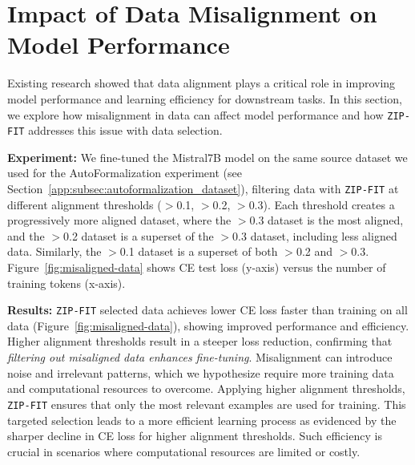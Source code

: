 \section{Impact of Data Misalignment on Model Performance}

Existing research showed that data alignment plays a critical role in improving model performance and learning efficiency for downstream tasks. In this section, we explore how misalignment in data can affect model performance and how \texttt{ZIP-FIT} addresses this issue with data selection.

\textbf{Experiment:} We fine-tuned the Mistral7B model on the same source dataset we used for the AutoFormalization experiment (see Section~\ref{app:subsec:autoformalization_dataset}), filtering data with \texttt{ZIP-FIT} at different alignment thresholds ($>$0.1, $>$0.2, $>$0.3). 
Each threshold creates a progressively more aligned dataset, where the $>$0.3 dataset is the most aligned, and the $>$0.2 dataset is a superset of the $>$0.3 dataset, including less aligned data. 
Similarly, the $>$0.1 dataset is a superset of both $>$0.2 and $>$0.3.
Figure~\ref{fig:misaligned-data} shows CE test loss (y-axis) versus the number of training tokens (x-axis). 

\textbf{Results:} \texttt{ZIP-FIT} selected data achieves lower CE loss faster than training on all data (Figure~\ref{fig:misaligned-data}), showing improved performance and efficiency. 
Higher alignment thresholds result in a steeper loss reduction, confirming that \textit{filtering out misaligned data enhances fine-tuning}. 
Misalignment can introduce noise and irrelevant patterns, which we hypothesize require more training data and computational resources to overcome. 
Applying higher alignment thresholds, \texttt{ZIP-FIT} ensures that only the most relevant examples are used for training. 
This targeted selection leads to a more efficient learning process as evidenced by the sharper decline in CE loss for higher alignment thresholds. 
Such efficiency is crucial in scenarios where computational resources are limited or costly.


